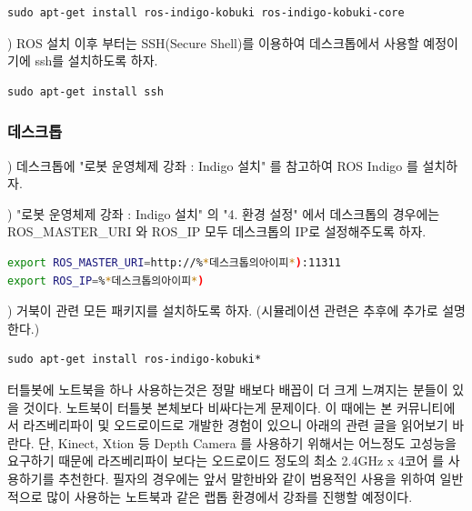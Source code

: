 \begin{lstlisting}[language=ROS]
sudo apt-get install ros-indigo-kobuki ros-indigo-kobuki-core
\end{lstlisting}

\vspace{\baselineskip}
\noindent{}
\thenum) ROS 설치 이후 부터는 SSH(Secure Shell)를 이용하여 데스크톱에서 사용할 예정이기에  ssh를 설치하도록 하자.

\begin{lstlisting}[language=ROS]
sudo apt-get install ssh
\end{lstlisting}

\subsubsection{데스크톱}

\vspace{\baselineskip}
\noindent{}
\thenum) 데스크톱에 "로봇 운영체제 강좌 : Indigo 설치" 를 참고하여 ROS Indigo 를 설치하자. 

\vspace{\baselineskip}
\noindent{}
\thenum) "로봇 운영체제 강좌 : Indigo 설치" 의 "4. 환경 설정" 에서 데스크톱의 경우에는 ROS\_MASTER\_URI 와 ROS\_IP 모두 데스크톱의 IP로 설정해주도록 하자. 

\begin{lstlisting}[language=bash]
export ROS_MASTER_URI=http://%*데스크톱의아이피*):11311
export ROS_IP=%*데스크톱의아이피*)
\end{lstlisting}

\vspace{\baselineskip}
\noindent{}
\thenum) 거북이 관련 모든 패키지를 설치하도록 하자. (시뮬레이션 관련은 추후에 추가로 설명한다.)

\begin{lstlisting}[language=ROS]
sudo apt-get install ros-indigo-kobuki*
\end{lstlisting}

\begin{corollary}
터틀봇에 노트북을 하나 사용하는것은 정말 배보다 배꼽이 더 크게 느껴지는 분들이 있을 것이다. 노트북이 터틀봇 본체보다 비싸다는게 문제이다. 이 때에는 본 커뮤니티에서 라즈베리파이 및 오드로이드로 개발한 경험이 있으니 아래의 관련 글을 읽어보기 바란다. 단, Kinect, Xtion 등 Depth Camera 를 사용하기 위해서는 어느정도 고성능을 요구하기 때문에 라즈베리파이 보다는 오드로이드 정도의 최소 2.4GHz x 4코어 를 사용하기를 추천한다. 필자의 경우에는 앞서 말한바와 같이 범용적인 사용을 위하여 일반적으로 많이 사용하는 노트북과 같은 랩톱 환경에서 강좌를 진행할 예정이다. 
\end{corollary}

